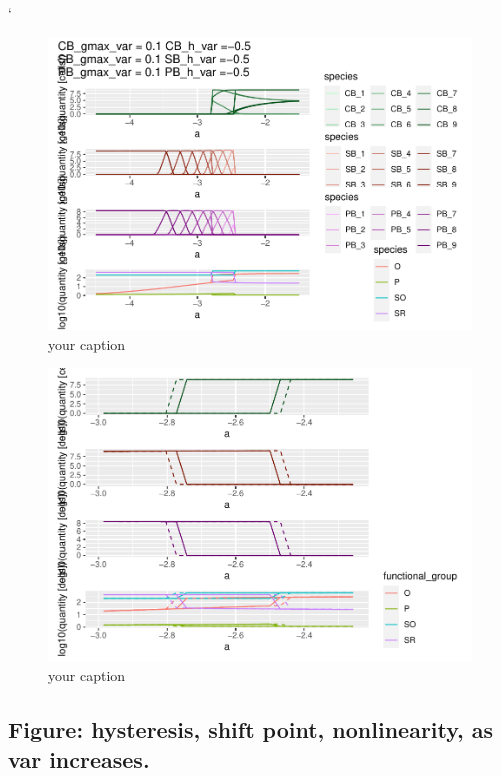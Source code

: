 \documentclass{article}
\begin{document}
`

\begin{figure}

{\centering \includegraphics[width=1\linewidth]{article_files/figure-latex/ss_var-1} 

}

\caption{your caption}\label{fig:ss_var}
\end{figure}

\begin{figure}

{\centering \includegraphics[width=1\linewidth]{article_files/figure-latex/ss_var2-1} 

}

\caption{your caption}\label{fig:ss_var2}
\end{figure}

\hypertarget{figure-hysteresis-shift-point-nonlinearity-as-var-increases.}{%
\subsection{Figure: hysteresis, shift point, nonlinearity, as var
increases.}\label{figure-hysteresis-shift-point-nonlinearity-as-var-increases.}}
\end{document}

